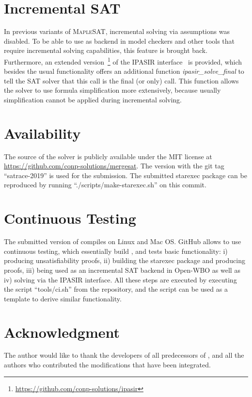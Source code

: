 \documentclass[conference]{IEEEtran}
\begin{document}
\section{Incremental SAT}

In previous variants of \textsc{MapleSAT}, incremental solving via assumptions was disabled.
To be able to use \mergesat as backend in model checkers and other tools that require incremental solving capabilities, this feature is brought back.
Furthermore, an extended version~\footnote{\url{https://github.com/conp-solutions/ipasir}} of the IPASIR interface~\cite{BalyoBiereIserSinz-AI-16} is provided, which besides the usual functionality offers an additional
function \emph{ipasir\_solve\_final} to tell the SAT solver that this call is the final (or only) call.
This function allows the solver to use formula simplification more extensively, because usually simplification cannot be applied during incremental solving.

\section{Availability}

The source of the solver is publicly available under the MIT license at \url{https://github.com/conp-solutions/mergesat}.
The version with the git tag ``satrace-2019'' is used for the submission.
The submitted starexec package can be reproduced by running ``./scripts/make-starexec.sh'' on this commit.

\section{Continuous Testing}

The submitted version of \mergesat compiles on Linux and Mac OS.
GitHub allows to use continuous testing, which essentially build \mergesat, and tests basic functionality:
i) producing unsatisfiability proofs, ii) building the starexec package and producing proofs, iii) being used as an incremental SAT backend in Open-WBO as well as  iv) solving via the IPASIR interface.
All these steps are executed by executing the script ``tools/ci.sh'' from the repository, and the script can be used as a template to derive similar functionality.

\section*{Acknowledgment}

The author would like to thank the developers of all predecessors of \mergesat, and all the authors who contributed the modifications that have been integrated.



\end{document}
